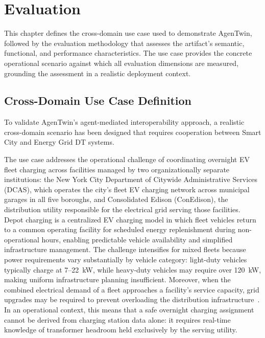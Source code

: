 \chapter{Evaluation}
\label{chap:evaluation}

This chapter defines the cross-domain use case used to demonstrate AgenTwin,
    followed by the evaluation methodology that assesses the artifact's
    semantic, functional, and performance characteristics.
The use case provides the concrete operational scenario against which all evaluation
    dimensions are measured, grounding the assessment in a realistic deployment context.

\section{Cross-Domain Use Case Definition}
\label{sec:use-case}

To validate AgenTwin's agent-mediated interoperability approach,
    a realistic cross-domain scenario has been designed that requires
    cooperation between Smart City and Energy Grid DT systems.

The use case addresses the operational challenge of coordinating overnight EV fleet charging
    across facilities managed by two organizationally separate institutions:
    the New York City Department of Citywide Administrative Services (DCAS),
    which operates the city's fleet EV charging network across municipal garages in all five boroughs,
    and Consolidated Edison (ConEdison),
    the distribution utility responsible for the electrical grid serving those facilities.
Depot charging is a centralized EV charging model in which fleet vehicles return to
    a common operating facility for scheduled energy replenishment during non-operational hours,
    enabling predictable vehicle availability and simplified infrastructure
    management.
The challenge intensifies for mixed fleets because power requirements vary substantially
    by vehicle category: light-duty vehicles typically charge at 7--22~kW,
    while heavy-duty vehicles may require over 120~kW,
    making uniform infrastructure planning insufficient.
Moreover, when the combined electrical demand of a fleet approaches a facility's
    service capacity, grid upgrades may be required to prevent overloading
    the distribution infrastructure~\cite{monta2026}.
In an operational context, this means that a safe overnight charging assignment
    cannot be derived from charging station data alone:
    it requires real-time knowledge of transformer headroom held exclusively
    by the serving utility.

